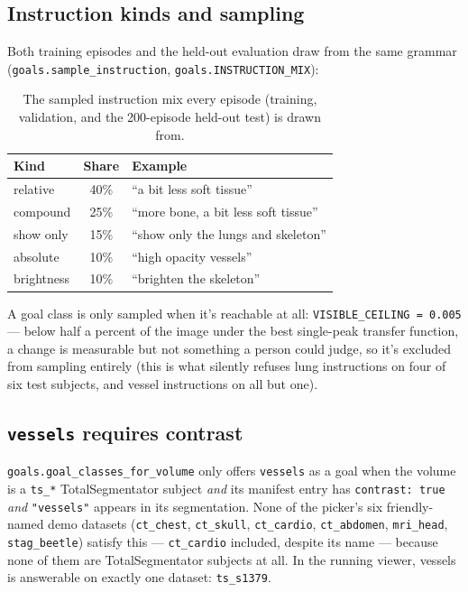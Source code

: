 \documentclass[10pt]{article}
\newcommand{\code}[1]{\texttt{#1}}
\begin{document}
\subsection{Instruction kinds and sampling}
\label{sec:instruction-mix}

Both training episodes and the held-out evaluation draw from the same
grammar (\code{goals.sample\_instruction}, \code{goals.INSTRUCTION\_MIX}):

\begin{table}[h]
\centering\small
\begin{tabular}{@{}lcl@{}}
\toprule
\textbf{Kind} & \textbf{Share} & \textbf{Example} \\
\midrule
relative & 40\% & ``a bit less soft tissue'' \\
compound & 25\% & ``more bone, a bit less soft tissue'' \\
show only & 15\% & ``show only the lungs and skeleton'' \\
absolute & 10\% & ``high opacity vessels'' \\
brightness & 10\% & ``brighten the skeleton'' \\
\bottomrule
\end{tabular}
\caption{The sampled instruction mix every episode (training, validation,
and the 200-episode held-out test) is drawn from.}
\end{table}

A goal class is only sampled when it's reachable at all:
\code{VISIBLE\_CEILING = 0.005} --- below half a percent of the image under
the best single-peak transfer function, a change is measurable but not
something a person could judge, so it's excluded from sampling entirely
(this is what silently refuses lung instructions on four of six test
subjects, and vessel instructions on all but one).

\subsection{\code{vessels} requires contrast}
\label{sec:vessels-gate}

\code{goals.goal\_classes\_for\_volume} only offers \code{vessels} as a goal
when the volume is a \code{ts\_*} TotalSegmentator subject \emph{and} its
manifest entry has \code{contrast: true} \emph{and} \code{"vessels"} appears
in its segmentation. None of the picker's six friendly-named demo datasets
(\code{ct\_chest}, \code{ct\_skull}, \code{ct\_cardio}, \code{ct\_abdomen},
\code{mri\_head}, \code{stag\_beetle}) satisfy this --- \code{ct\_cardio}
included, despite its name --- because none of them are TotalSegmentator
subjects at all. In the running viewer, vessels is answerable on exactly one
dataset: \code{ts\_s1379}.
\end{document}
